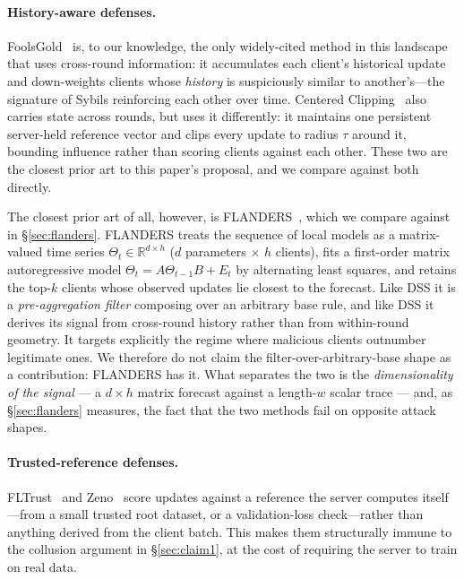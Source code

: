 \documentclass[11pt,a4paper]{article}
\begin{document}
\paragraph{History-aware defenses.}
FoolsGold~\cite{fung2020} is, to our knowledge, the only widely-cited
method in this landscape that uses cross-round information: it accumulates
each client's historical update and down-weights clients whose
\emph{history} is suspiciously similar to another's---the signature of
Sybils reinforcing each other over time. Centered
Clipping~\cite{karimireddy2021} also carries state across rounds, but uses
it differently: it maintains one persistent server-held reference vector
and clips every update to radius $\tau$ around it, bounding influence
rather than scoring clients against each other. These two are the closest
prior art to this paper's proposal, and we compare against both directly.

The closest prior art of all, however, is
FLANDERS~\cite{gabrielli2024}, which we compare against in
\S\ref{sec:flanders}. FLANDERS treats the sequence of local models as a
matrix-valued time series $\Theta_t \in \mathbb{R}^{d \times h}$
($d$ parameters $\times$ $h$ clients), fits a first-order matrix
autoregressive model $\Theta_t = A\Theta_{t-1}B + E_t$ by alternating
least squares, and retains the top-$k$ clients whose observed updates
lie closest to the forecast. Like DSS it is a \emph{pre-aggregation
filter} composing over an arbitrary base rule, and like DSS it derives
its signal from cross-round history rather than from within-round
geometry. It targets explicitly the regime where malicious clients
outnumber legitimate ones. We therefore do not claim the
filter-over-arbitrary-base shape as a contribution: FLANDERS has it.
What separates the two is the \emph{dimensionality of the signal} --- a
$d \times h$ matrix forecast against a length-$w$ scalar trace --- and,
as \S\ref{sec:flanders} measures, the fact that the two methods fail on
opposite attack shapes.

\paragraph{Trusted-reference defenses.}
FLTrust~\cite{cao2021} and Zeno~\cite{xie2019} score updates against a
reference the server computes itself---from a small trusted root dataset,
or a validation-loss check---rather than anything derived from the client
batch. This makes them structurally immune to the collusion argument in
\S\ref{sec:claim1}, at the cost of requiring the server to train on real
data.
\end{document}
